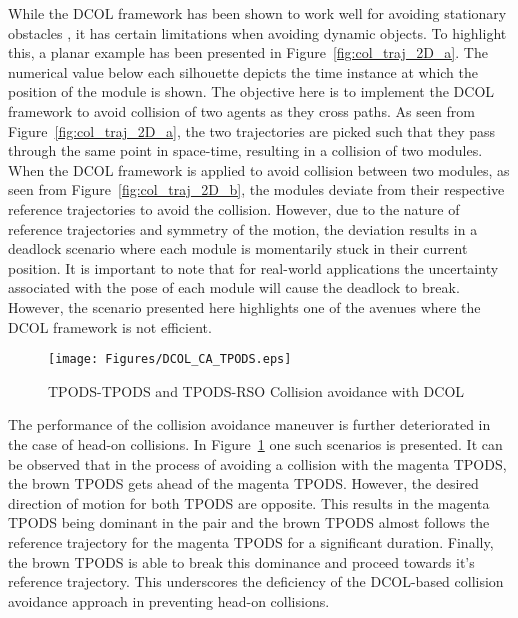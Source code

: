 While the DCOL framework has been shown to work well for avoiding stationary obstacles \cite{parikh2024rapidtrajectoryoptimizationcontrol,DCOL}, it has certain limitations when avoiding dynamic objects. To highlight this, a planar example has been presented in Figure~\ref{fig:col_traj_2D_a}. The numerical value below each silhouette depicts the time instance at which the position of the module is shown. The objective here is to implement the DCOL framework to avoid collision of two agents as they cross paths. As seen from Figure~\ref{fig:col_traj_2D_a}, the two trajectories are picked such that they pass through the same point in space-time, resulting in a collision of two modules. When the DCOL framework is applied to avoid collision between two modules, as seen from Figure~\ref{fig:col_traj_2D_b}, the modules deviate from their respective reference trajectories to avoid the collision. However, due to the nature of reference trajectories and symmetry of the motion, the deviation results in a deadlock scenario where each module is momentarily stuck in their current position. It is important to note that for real-world applications the uncertainty associated with the pose of each module will cause the deadlock to break. However, the scenario presented here highlights one of the avenues where the DCOL framework is not efficient. 

\begin{figure}[!b]
\centerline{\texttt{[image: Figures/DCOL\_CA\_TPODS.eps]}}
\caption{TPODS-TPODS and TPODS-RSO Collision avoidance with DCOL}
\label{fig:DCOL_CA_TPODS}
\end{figure}

The performance of the collision avoidance maneuver is further deteriorated in the case of head-on collisions. In Figure~\ref{fig:DCOL_CA_TPODS} one such scenarios is presented. It can be observed that in the process of avoiding a collision with the magenta TPODS, the brown TPODS gets ahead of the magenta TPODS. However, the desired direction of motion for both TPODS are opposite. This results in the magenta TPODS being dominant in the pair and the brown TPODS almost follows the reference trajectory for the magenta TPODS for a significant duration. Finally, the brown TPODS is able to break this dominance and proceed towards it's reference trajectory. This underscores the deficiency of the DCOL-based collision avoidance approach in preventing head-on collisions. 

